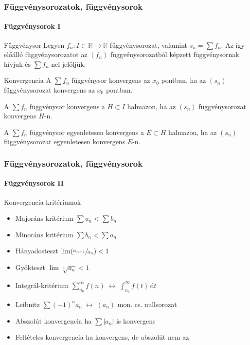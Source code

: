 \begin{frame}
  \frametitle{Függvénysorozatok, függvénysorok}
  \framesubtitle{Függvénysorok I}

  \begin{block}{Függvénysor}
    Legyen $f_n : I \subset \mathbb R \rightarrow \mathbb R$ függvénysorozat,
    valamint $s_n = \sum f_n$. Az így előálló függvénysorozatot az $(f_n)$
    függvénysorozatból képzett függvénysornak hívjuk és $\sum f_n$-nel jelöljük.
  \end{block}

  \begin{block}{Konvergencia}
    A $\sum f_n$ függvénysor konvergens az $x_0$ pontban, ha az $(s_n)$
    függvénysorozat konvergens az $x_0$ pontban.

    A $\sum f_n$ függvénysor konvergens a $H \subset I$ halmazon, ha az $(s_n)$
    függvénysorozat konvergens $H$-n.

    A $\sum f_n$ függvénysor egyenletesen konvergens a $E \subset H$ halmazon, ha az
    $(s_n)$ függvénysorozat egyenletesen konvergens $E$-n.
  \end{block}
\end{frame}

\begin{frame}
  \frametitle{Függvénysorozatok, függvénysorok}
  \framesubtitle{Függvénysorok II}

  \begin{block}{Konvergencia kritériumok}
    \begin{itemize}
      \item Majoráns kritérium \hfill $\sum a_n < \sum b_n$
      \item Minoráns kritérium \hfill $\sum b_n < \sum a_n$
      \item Hányadosteszt \hfill $\lim (\sfrac{a_{n+1}}{a_{n}}) < 1$
      \item Gyökteszt \hfill $\lim \sqrt[n]{a_n} < 1$
      \item Integrál-kritérium \hfill $\sum_{n_0}^\infty f(n) \; \leftrightarrow \; \int_{n_0}^\infty f(t) \,\mathrm dt$
      \item Leibnitz \hfill $\sum (-1)^n a_n \; \leftrightarrow \; (a_n)$ mon. cs. nullsorozat
      \item Abszolút konvergencia \hfill ha $\sum |a_n|$ is konvergens
      \item Feltételes konvergencia \hfill ha konvergens, de abszolút nem az
    \end{itemize}
  \end{block}
\end{frame}

